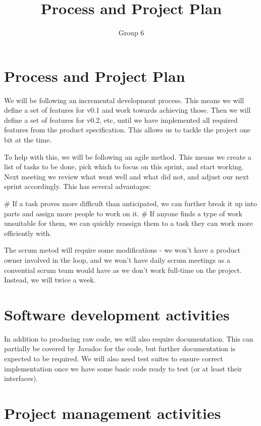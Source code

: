 \documentclass{article}
\title{Process and Project Plan}
\author{Group 6}
\begin{document}
\maketitle

\section*{Process and Project Plan}

We will be following an incremental development process. This means we will define a set of features for v0.1 and work towards achieving those. Then we will define a set of features for v0.2, etc, until we have implemented all required features from the product specification. This allows us to tackle the project one bit at the time.

To help with this, we will be following an agile method. This means we create a list of tasks to be done, pick which to focus on this sprint, and start working. Next meeting we review what went well and what did not, and adjust our next sprint accordingly. This has several advantages:

\begin{easylist}
    # If a task proves more difficult than anticipated, we can further break it up into parts and assign more people to work on it.
    # If anyone finds a type of work unsuitable for them, we can quickly reassign them to a task they can work more efficiently with.
\end{easylist}

The scrum metod will require some modifications - we won't have a product owner involved in the loop, and we won't have daily scrum meetings as a convential scrum team would have as we don't work full-time on the project. Instead, we will twice a week.

\section*{Software development activities}

In addition to producing raw code, we will also require documentation. This can partially be covered by Javadoc for the code, but further documentation is expected to be required. We will also need test suites to ensure correct implementation once we have some basic code ready to test (or at least their interfaces).

\section*{Project management activities}
\end{document}
